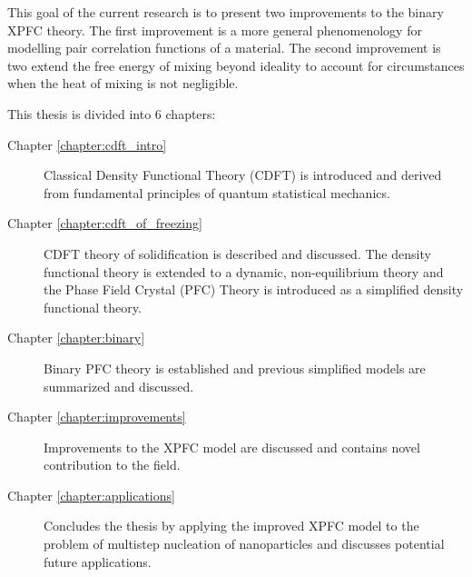 
This goal of the current research is to present two improvements to the
binary XPFC theory. The first improvement is a more general phenomenology
for modelling pair correlation functions of a material. The second 
improvement is two extend the free energy of mixing beyond ideality to 
account for circumstances when the heat of mixing is not negligible.


This thesis is divided into 6 chapters:
%
\begin{description}
    \item [Chapter \ref{chapter:cdft_intro}] { Classical Density Functional
        Theory (CDFT) is introduced and derived from fundamental principles of
        quantum statistical mechanics.
    }
    \item [Chapter \ref{chapter:cdft_of_freezing}] { CDFT theory of
        solidification is described and discussed. The density functional
        theory is extended to a dynamic, non-equilibrium theory and the Phase
        Field Crystal (PFC) Theory is introduced as a simplified density
        functional theory.
    }
    \item [Chapter \ref{chapter:binary}] { Binary PFC theory is established and
        previous simplified models are summarized and discussed.
    }
    \item [Chapter \ref{chapter:improvements}] { Improvements to the XPFC model
        are discussed and contains novel contribution to the field.
    }
    \item [Chapter \ref{chapter:applications}] { Concludes the thesis by
        applying the improved XPFC model to the problem of multistep nucleation
        of nanoparticles and discusses potential future applications.
    } 
\end{description}
%

